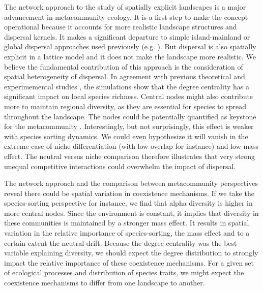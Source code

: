 \documentclass[12pt]{article}
\begin{document}
The network approach to the study of spatially explicit landscapes is a major
advancement in metacommunity ecology. It is a first step to make the concept
operational because it accounts for more realistic landscape structures and
dispersal kernels. It makes a significant departure to simple island-mainland or
global dispersal approaches used previously (e.g. \parencite{Tilman1994,
Mouquet2002, Hubbell2001}). But dispersal is also spatially explicit in a
lattice model and it does not make the landscape more realistic. We believe the
fundamental contribution of this approach is the consideration of spatial
heterogeneity of dispersal. In agreement with previous theoretical
\parencite{Economo2011, Desjardins2012} and experimemental studies
\parencite{Altermat2012}, the simulations show that the degree centrality has a
significant impact on local species richness. Central nodes might also
contribute more to maintain regional diversity, as they are essential for
species to spread throughout the landscape. The nodes could be potentially
quantified as keystone for the metacommunity \parencite{Mouquet2013}.
Interestingly, but not surprisingly, this effect is weaker with species sorting
dynamics. We could even hypothesize it will vanish in the extreme case of niche
differentiation (with low overlap for instance) and low mass effect. The neutral
versus niche comparison therefore illustrates that very strong unequal
competitive interactions could overwhelm the impact of dispersal.

The network approach and the comparison between metacommunity perspectives
reveal there could be spatial variation in coexistence mechanisms. If we take
the species-sorting perspective for instance, we find that alpha diversity is
higher in more central nodes. Since the environment is constant, it implies that
diversity in these communities is maintained by a stronger mass effect. It
results in spatial variation in the relative importance of species-sorting, the
mass effect and to a certain extent the neutral drift. Because the degree
centrality was the best variable explaining diversity, we should expect the
degree distribution to strongly impact the relative importance of these
coexistence mechanisms. For a given set of ecological processes and distribution
of species traits, we might expect the coexistence mechanisms to differ from one
landscape to another.
\end{document}
